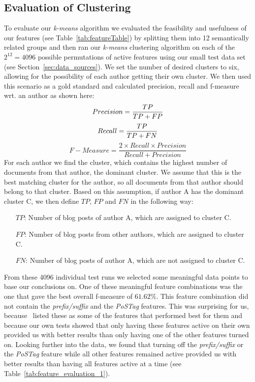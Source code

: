 \subsection{Evaluation of Clustering}
\label{sec:evaluation_clustering}
To evaluate our \textit{k-means} algorithm we evaluated the feasibility and usefulness of our features (see Table~\ref{tab:featureTable}) by splitting them into 12 semantically related groups and then ran our \textit{k-means} clustering algorithm on each of the $2^{12} = 4096$ possible permutations of active features using our small test data set (see Section~\ref{sec:data_sources}).
We set the number of desired clusters to six, allowing for the possibility of each author getting their own cluster.
We then used this scenario as a gold standard and calculated precision, recall and f-measure wrt. an author as shown here:
\begin{equation}
	Precision = \frac{TP}{TP + FP} \\
	\label{eq:precision}
\end{equation}
\begin{equation}
	Recall = \frac{TP}{TP + FN} \\
	\label{eq:recall}
\end{equation}
\begin{equation}
	F-Measure = \frac{2 \times Recall \times Precision}{Recall + Precision}
	\label{eq:fMeasure}
\end{equation}
For each author we find the cluster, which contains the highest number of documents from that author, the dominant cluster.
We assume that this is the best matching cluster for the author, so all documents from that author should belong to that cluster.
Based on this assumption, if author A has the dominant cluster C, we then define $TP$, $FP$ and $FN$ in the following way:
\begin{itemize}
	\item[$TP$:] Number of blog posts of author A, which are assigned to cluster C. \\
	\item[$FP$:] Number of blog posts from other authors, which are assigned to cluster C. \\
	\item[$FN$:] Number of blog posts of author A, which are not assigned to cluster C.
\end{itemize}

From these 4096 individual test runs we selected some meaningful data points to base our conclusions on.
One of these meaningful feature combinations was the one that gave the best overall f-measure of $61.62\%$.
This feature combination did not contain the \textit{prefix/suffix} and the \textit{PoSTag} features.
This was surprising for us, because~\cite{madigan2005author} listed these as some of the features that performed best for them and because our own tests showed that only having these features active on their own provided us with better results than only having one of the other features turned on.
Looking further into the data, we found that turning off the \textit{prefix/suffix} or the \textit{PoSTag} feature while all other features remained active provided us with better results than having all features active at a time (see Table~\ref{tab:feature_evaluation_1}).

